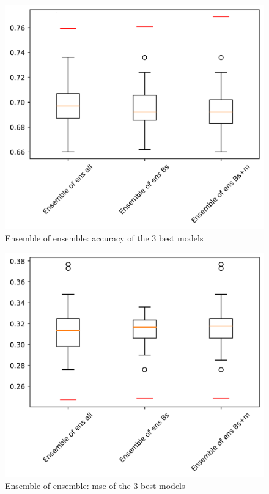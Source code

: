 \documentclass[10pt,letterpaper]{article}
\begin{document}
\begin{figure}[h!]
  \begin{minipage}[b]{0.49\textwidth}
  \includegraphics[scale=0.35]{results/eoe_acc.png}
    \caption{Ensemble of ensemble: accuracy of the 3 best models}
   \label{marker5}
  \end{minipage}
  \hfill
\end{figure}

\begin{figure}[h!]
  \begin{minipage}[b]{0.49\textwidth}
  \includegraphics[scale=0.35]{results/eoe_mse.png}
    \caption{Ensemble of ensemble: mse of the 3 best models}
   \label{marker5}
  \end{minipage}
  \hfill
\end{figure}
\end{document}
